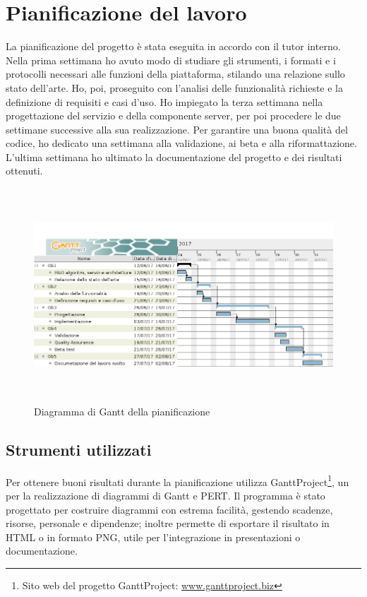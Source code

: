 \section{Pianificazione del lavoro}
La pianificazione del progetto è stata eseguita in accordo con il tutor interno. Nella prima settimana ho avuto modo di studiare gli strumenti, i formati e i protocolli necessari alle funzioni della piattaforma, stilando una relazione sullo stato dell'arte. Ho, poi, proseguito con l'analisi delle funzionalità richieste e la definizione di requisiti e casi d'uso. Ho impiegato la terza settimana nella progettazione del servizio e della componente server, per poi procedere le due settimane successive alla sua realizzazione. Per garantire una buona qualità del codice, ho dedicato una settimana alla validazione, ai beta  e alla riformattazione. L'ultima settimana ho ultimato la documentazione del progetto e dei risultati ottenuti.
\begin{figure}[H]
   \begin{center}
      \includegraphics[height=8cm,width=15cm,keepaspectratio]{immagini/pianificazione-gantt}
      \caption{Diagramma di Gantt della pianificazione}
   \end{center}
\end{figure}

   \subsection{Strumenti utilizzati}
   Per ottenere buoni risultati durante la pianificazione \nomeAzienda{} utilizza GanttProject\footnote{Sito web del progetto GanttProject: \href{http://www.ganttproject.biz/}{www.ganttproject.biz}}, un   per la realizzazione di diagrammi di \gls{Gantt} e \gls{PERT}. Il programma è stato progettato per costruire diagrammi con estrema facilità, gestendo scadenze, risorse, personale e dipendenze; inoltre permette di esportare il risultato in \gls{HTML} o in formato \gls{PNG}, utile per l'integrazione in presentazioni o documentazione.\
